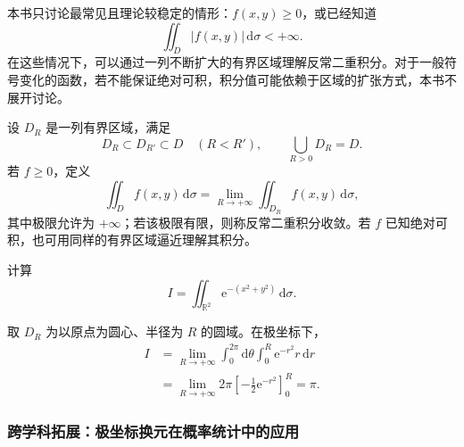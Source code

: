 \documentclass[fontset=fandol]{ctexart}
\newcommand{\dd}{\mathrm{d}}
\newcommand{\ee}{\mathrm{e}}
\newcommand{\RR}{\mathbb{R}}
\begin{document}
本书只讨论最常见且理论较稳定的情形：$f(x,y)\geq0$，或已经知道
\[
\iint_D|f(x,y)|\,\dd\sigma<+\infty.
\]
在这些情况下，可以通过一列不断扩大的有界区域理解反常二重积分。对于一般符号变化的函数，若不能保证绝对可积，积分值可能依赖于区域的扩张方式，本书不展开讨论。

设 $D_R$ 是一列有界区域，满足
\[
D_R\subset D_{R'}\subset D\quad(R<R'),
\qquad
\bigcup_{R>0}D_R=D.
\]
若 $f\geq0$，定义
\[
\iint_Df(x,y)\,\dd\sigma
=\lim_{R\to+\infty}\iint_{D_R}f(x,y)\,\dd\sigma,
\]
其中极限允许为 $+\infty$；若该极限有限，则称反常二重积分收敛。若 $f$ 已知绝对可积，也可用同样的有界区域逼近理解其积分。

\begin{example}[全平面上的反常二重积分]
计算
\[
I=\iint_{\RR^2}\ee^{-(x^2+y^2)}\,\dd\sigma.
\]

取 $D_R$ 为以原点为圆心、半径为 $R$ 的圆域。在极坐标下，
\[
\begin{aligned}
I&=\lim_{R\to+\infty}\int_0^{2\pi}\dd\theta\int_0^R \ee^{-r^2}r\,\dd r\\
&=\lim_{R\to+\infty}2\pi\left[-\frac12\ee^{-r^2}\right]_0^R
=\pi.
\end{aligned}
\]
\end{example}

\subsubsection*{跨学科拓展：极坐标换元在概率统计中的应用}
\end{document}
